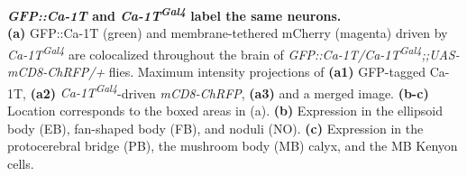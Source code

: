 \label{fig:S2}
\textbf{\emph{GFP::Ca-\alpha1T} and \emph{Ca-\alpha1T\textsuperscript{Gal4}} label the same neurons.}
\\
\textbf{(a)} GFP::Ca-\alpha1T (green) and membrane-tethered mCherry (magenta) driven by \emph{Ca-\alpha1T\textsuperscript{Gal4}} are colocalized throughout the brain of \emph{GFP::Ca-\alpha1T/Ca-\alpha1T\textsuperscript{Gal4};;UAS-mCD8-ChRFP/+} flies.
Maximum intensity projections of \textbf{(a1)} GFP-tagged Ca-\alpha1T, \textbf{(a2)} \emph{Ca-\alpha1T\textsuperscript{Gal4}}-driven \emph{mCD8-ChRFP}, \textbf{(a3)} and a merged image.
\textbf{(b-c)} Location corresponds to the boxed areas in (a).
\textbf{(b)} Expression in the ellipsoid body (EB), fan-shaped body (FB), and noduli (NO).
\textbf{(c)} Expression in the protocerebral bridge (PB), the mushroom body (MB) calyx, and the MB Kenyon cells.
